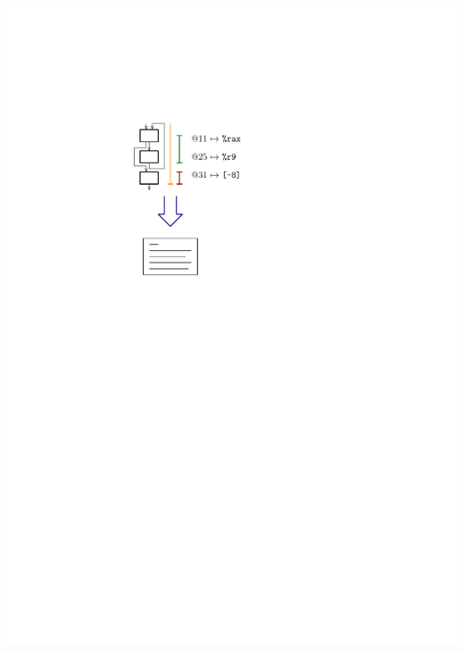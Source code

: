 \documentclass[navbaroff,en]{sdqbeamer}
\begin{document}
\begin{frame}
\begin{columns}
	\begin{column}{0.3\textwidth}
		\centering \includegraphics[scale=0.7]{images/code_generation.pdf}
	\end{column}
\end{columns}
\end{frame}
\end{document}
